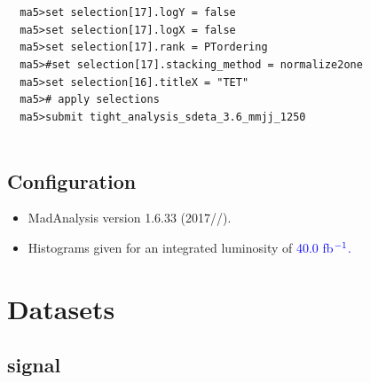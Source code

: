 \documentclass[a4paper, 10pt]{article}
\begin{document}
\texttt{ }\texttt{ }\texttt{ma5>set selection[17].logY = false\\
}
\texttt{ }\texttt{ }\texttt{ma5>set selection[17].logX = false\\
}
\texttt{ }\texttt{ }\texttt{ma5>set selection[17].rank = PTordering\\
}
\texttt{ }\texttt{ }\texttt{ma5>\#set selection[17].stacking\_method = normalize2one\\
}
\texttt{ }\texttt{ }\texttt{ma5>set selection[16].titleX = "TET"\\
}
\texttt{ }\texttt{ }\texttt{ma5>\# apply selections\\
}
\texttt{ }\texttt{ }\texttt{ma5>submit tight\_analysis\_sdeta\_3.6\_mmjj\_1250\\
}
\texttt{ }\texttt{ }\subsection{ Configuration}

\begin{itemize}
  \item MadAnalysis version 1.6.33 (2017//).
   \item Histograms given for an integrated luminosity of \textcolor{blue}{40.0}\textcolor{blue}{ fb}$^{\textcolor{blue}{-1}}$\textcolor{blue}{.}
\textcolor{blue}{}
\end{itemize}
\newpage
\section{ Datasets}

\subsection{ signal}
\end{document}
